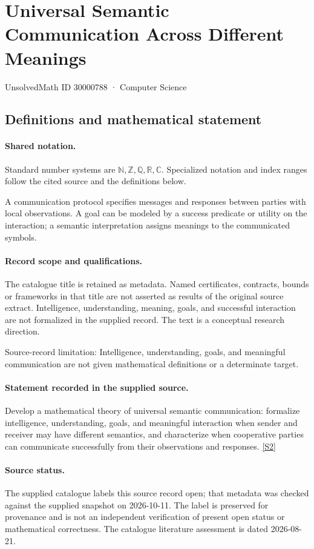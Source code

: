 \documentclass[11pt]{article}
\newcommand{\sref}[2]{\hyperlink{source:#1:#2}{[S#2]}}
\begin{document}
\setcounter{section}{30000787}
\section{Universal Semantic Communication Across Different Meanings}\label{30000788}
{\small\sffamily UnsolvedMath ID 30000788 · Computer Science}
\subsection{Definitions and mathematical statement}

\paragraph{Shared notation.}Standard number systems are $\mathbb N,\mathbb Z,\mathbb Q,\mathbb R,\mathbb C$. Specialized notation and index ranges follow the cited source and the definitions below.


A communication protocol specifies messages and responses between parties with local observations. A goal can be modeled by a success predicate or utility on the interaction; a semantic interpretation assigns meanings to the communicated symbols.
\paragraph{Record scope and qualifications.}
The catalogue title is retained as metadata. Named certificates, contracts, bounds or frameworks in that title are not asserted as results of the original source extract.
Intelligence, understanding, meaning, goals, and successful interaction are not formalized in the supplied record. The text is a conceptual research direction.

Source-record limitation: Intelligence, understanding, goals, and meaningful communication are not given mathematical definitions or a determinate target.
\paragraph{Statement recorded in the supplied source.}
Develop a mathematical theory of universal semantic communication: formalize intelligence, understanding, goals, and meaningful interaction when sender and receiver may have different semantics, and characterize when cooperative parties can communicate successfully from their observations and responses. \sref{30000788}{2}
\paragraph{Source status.}
The supplied catalogue labels this source record open; that metadata was checked against the supplied snapshot on 2026-10-11. The label is preserved for provenance and is not an independent verification of present open status or mathematical correctness. The catalogue literature assessment is dated 2026-08-21.
\end{document}
